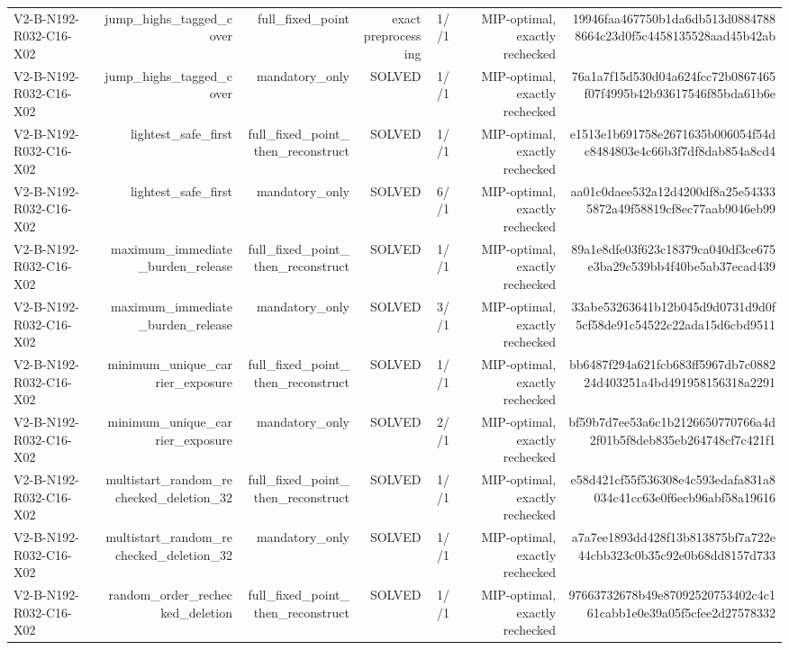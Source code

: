 {\begin{longtable}{lrrrrrr}
V2-B-N192-R032-C16-X02 & jump\_highs\_tagged\_cover & full\_fixed\_point & exact preprocessing & 1//1 & MIP-optimal, exactly rechecked & 19946faa467750b1da6db513d08847888664c23d0f5c4458135528aad45b42ab \\
V2-B-N192-R032-C16-X02 & jump\_highs\_tagged\_cover & mandatory\_only & SOLVED & 1//1 & MIP-optimal, exactly rechecked & 76a1a7f15d530d04a624fcc72b0867465f07f4995b42b93617546f85bda61b6e \\
V2-B-N192-R032-C16-X02 & lightest\_safe\_first & full\_fixed\_point\_then\_reconstruct & SOLVED & 1//1 & MIP-optimal, exactly rechecked & e1513e1b691758e2671635b006054f54dc8484803e4c66b3f7df8dab854a8cd4 \\
V2-B-N192-R032-C16-X02 & lightest\_safe\_first & mandatory\_only & SOLVED & 6//1 & MIP-optimal, exactly rechecked & aa01c0daee532a12d4200df8a25e543335872a49f58819cf8ec77aab9046eb99 \\
V2-B-N192-R032-C16-X02 & maximum\_immediate\_burden\_release & full\_fixed\_point\_then\_reconstruct & SOLVED & 1//1 & MIP-optimal, exactly rechecked & 89a1e8dfe03f623c18379ca040df3ce675e3ba29c539bb4f40be5ab37ecad439 \\
V2-B-N192-R032-C16-X02 & maximum\_immediate\_burden\_release & mandatory\_only & SOLVED & 3//1 & MIP-optimal, exactly rechecked & 33abe53263641b12b045d9d0731d9d0f5cf58de91c54522c22ada15d6cbd9511 \\
V2-B-N192-R032-C16-X02 & minimum\_unique\_carrier\_exposure & full\_fixed\_point\_then\_reconstruct & SOLVED & 1//1 & MIP-optimal, exactly rechecked & bb6487f294a621fcb683ff5967db7c088224d403251a4bd491958156318a2291 \\
V2-B-N192-R032-C16-X02 & minimum\_unique\_carrier\_exposure & mandatory\_only & SOLVED & 2//1 & MIP-optimal, exactly rechecked & bf59b7d7ee53a6c1b2126650770766a4d2f01b5f8deb835eb264748cf7c421f1 \\
V2-B-N192-R032-C16-X02 & multistart\_random\_rechecked\_deletion\_32 & full\_fixed\_point\_then\_reconstruct & SOLVED & 1//1 & MIP-optimal, exactly rechecked & e58d421cf55f536308e4c593edafa831a8034c41cc63e0f6ecb96abf58a19616 \\
V2-B-N192-R032-C16-X02 & multistart\_random\_rechecked\_deletion\_32 & mandatory\_only & SOLVED & 1//1 & MIP-optimal, exactly rechecked & a7a7ee1893dd428f13b813875bf7a722e44cbb323c0b35c92e0b68dd8157d733 \\
V2-B-N192-R032-C16-X02 & random\_order\_rechecked\_deletion & full\_fixed\_point\_then\_reconstruct & SOLVED & 1//1 & MIP-optimal, exactly rechecked & 97663732678b49e87092520753402c4c161cabb1e0e39a05f5cfee2d27578332 \\

\end{longtable}}
